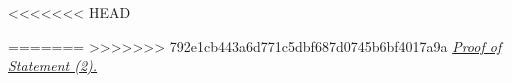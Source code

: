 <<<<<<< HEAD

=======
>>>>>>> 792e1cb443a6d771c5dbf687d0745b6bf4017a9a
\noindent \underline{\em Proof of Statement (2).} 
